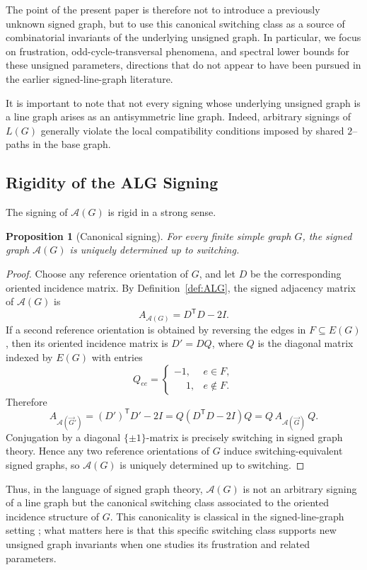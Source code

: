 \documentclass[11pt]{article}
\newtheorem{proposition}{Proposition}
\theoremstyle{plain}
\begin{document}
The point of the present paper is therefore not to introduce a previously
unknown signed graph, but to use this canonical switching class as a source of
combinatorial invariants of the underlying unsigned graph. In particular, we
focus on frustration, odd-cycle-transversal phenomena, and spectral lower bounds
for these unsigned parameters, directions that do not appear to have been
pursued in the earlier signed-line-graph literature.

It is important to note that not every signing whose underlying
unsigned graph is a line graph arises as an antisymmetric line graph.
Indeed, arbitrary signings of $L(G)$ generally violate the local compatibility
conditions imposed by shared $2$--paths in the base graph.

\subsection{Rigidity of the ALG Signing}

The signing of $\mathcal{A}(G)$ is rigid in a strong sense.


\begin{proposition}[Canonical signing]\label{prop:unique-signing}
For every finite simple graph $G$, the signed graph $\mathcal A(G)$ is uniquely determined up to switching.
\end{proposition}

\begin{proof}
Choose any reference orientation of $G$, and let $D$ be the corresponding
oriented incidence matrix. By Definition~\ref{def:ALG}, the signed adjacency
matrix of $\mathcal A(G)$ is
\[
A_{\mathcal A(G)} = D^{\mathsf T}D - 2I.
\]
If a second reference orientation is obtained by reversing the edges in
$F\subseteq E(G)$, then its oriented incidence matrix is $D' = DQ$, where
$Q$ is the diagonal matrix indexed by $E(G)$ with entries
\[
Q_{ee} =
\begin{cases}
-1,& e\in F,\\
\phantom{-}1,& e\notin F.
\end{cases}
\]
Therefore
\[
A_{\mathcal A(\vec G')}
= (D')^{\mathsf T}D' - 2I
= Q(D^{\mathsf T}D - 2I)Q
= Q\,A_{\mathcal A(\vec G)}\,Q.
\]
Conjugation by a diagonal $\{\pm1\}$-matrix is precisely switching in signed
graph theory. Hence any two reference orientations of $G$ induce
switching-equivalent signed graphs, so $\mathcal A(G)$ is uniquely determined
up to switching.
\end{proof}

Thus, in the language of signed graph theory, $\mathcal A(G)$ is not an arbitrary
signing of a line graph but the canonical switching class associated to the
oriented incidence structure of $G$. This canonicality is classical in the
signed-line-graph setting \cite{Zaslavsky2010Matrices,BelardoPisanskiStanicZaslavsky2023};
what matters here is that this specific switching class supports new unsigned
graph invariants when one studies its frustration and related parameters.
\end{document}
